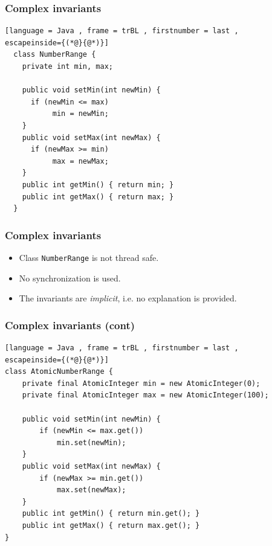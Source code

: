 \documentclass[xcolor={dvipsnames,svgnames},aspectratio=169]{beamer}
\begin{document}
\begin{frame}[fragile]
  \frametitle{Complex invariants}

\begin{lstlisting}[language = Java , frame = trBL , firstnumber = last ,
escapeinside={(*@}{@*)}]
  class NumberRange {
    private int min, max;

    public void setMin(int newMin) {
      if (newMin <= max)
           min = newMin;
    }
    public void setMax(int newMax) {
      if (newMax >= min)
           max = newMax;
    }
    public int getMin() { return min; }
    public int getMax() { return max; }
  }
\end{lstlisting}
\end{frame}

\begin{frame}[fragile]
  \frametitle{Complex invariants}

  \begin{itemize}
  \item[\faBook]<1-> Class \texttt{NumberRange} is not thread safe.
  \item[\faBook]<1-> No synchronization is used.
  \item[\faBook]<1-> The invariants are \emph{implicit}, i.e. no explanation is
    provided.
  \end{itemize}

\end{frame}

\begin{frame}[fragile]
  \frametitle{Complex invariants (cont)}

\begin{lstlisting}[language = Java , frame = trBL , firstnumber = last ,
escapeinside={(*@}{@*)}]
class AtomicNumberRange {
    private final AtomicInteger min = new AtomicInteger(0);
    private final AtomicInteger max = new AtomicInteger(100);

    public void setMin(int newMin) {
        if (newMin <= max.get())
            min.set(newMin);
    }
    public void setMax(int newMax) {
        if (newMax >= min.get())
            max.set(newMax);
    }
    public int getMin() { return min.get(); }
    public int getMax() { return max.get(); }
}
\end{lstlisting}
\end{frame}
\end{document}
